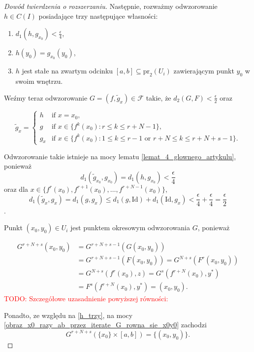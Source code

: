 \documentclass[licencjacka]{pwr_wmat_praca_dyplomowa}
\theoremstyle{plain}
\numberwithin{theorem}{chapter}
\theoremstyle{definition}
\numberwithin{theorem}{chapter}
\begin{document}
\begin{proof}[Dowód twierdzenia o rozszerzaniu]
Następnie, rozważmy odwzorowanie $h \in C(I)$ posiadające trzy następujące własności:
\begin{enumerate}[label=(h\arabic*)]
\item \label{h_jeden} $d_1(h, g_{x_0}) < \frac{\epsilon}{4}$,
\item \label{h_dwa} $h(y_0) = g_{x_0}(y_0)$,
\item \label{h_trzy} $h$ jest stałe na zwartym odcinku $[a,b] \subseteq \textrm{pr}_2(U_i)$ zawierającym punkt $y_0$ w swoim wnętrzu.
\end{enumerate}

Weźmy teraz odwzorowanie $G = (f, \widetilde{g}_x) \in \mathcal{F}$ takie, że $d_2(G, F) < \frac{\epsilon}{2}$ oraz

\begin{equation}
    \widetilde{g}_x =
    \begin{cases}
        h & \text{if $x=x_0$,}\\
        g & \text{if $x \in \{f^k(x_0) : r \leq k \leq r+N-1\}$,}\\
        g_x & \text{if $x \in \{f^k(x_0) : 1 \leq k \leq r-1$ or $r+N \leq k \leq r+N+s-1\}$.}
    \end{cases}
\end{equation}

Odwzorowanie takie istnieje na mocy lematu \ref{lemat_4_glownego_artykulu}, ponieważ
$$d_1(\widetilde{g}_{x_0}, g_{x_0}) = d_1(h, g_{x_0}) < \frac{\epsilon}{4}$$
oraz dla $x \in \{f^r(x_0), f^{r+1}(x_0), \ldots, f^{r+N-1}(x_0)\}$,
$$d_1(\widetilde{g}_x, g_x) = d_1(g, g_x) \leq d_1(g, \mathrm{Id}) + d_1(\mathrm{Id}, g_x) < \frac{\epsilon}{4} + \frac{\epsilon}{4} = \frac{\epsilon}{2}$$.

Punkt $(x_0, y_0) \in U_i$ jest punktem okresowym odwzorowania $G$, ponieważ

\begin{equation}
\begin{split}
G^{r+N+s}(x_0, y_0) & = G^{r+N+s-1}(G(x_0, y_0)) \\
& = G^{r+N+s-1}(F(x_0, y_0)) = G^{N+s}(F^r(x_0, y_0)) \\
& = G^{N+s}(f^r(x_0), z) = G^s(f^{r+N}(x_0), y^*) \\
& = F^s(f^{r+N}(x_0), y^*) = (x_0, y_0).
\end{split}
\end{equation}
\textcolor{red}{TODO: Szczegółowe uzasadnienie powyższej równości:}

Ponadto, ze względu na \ref{h_trzy}, na mocy \ref{obraz_x0_razy_ab_przez_iterate_G_rowna_sie_x0y0} zachodzi
$$G^{r+N+s}(\{x_0\} \times [a, b]) = \{(x_0, y_0)\}.$$


\end{proof}
\end{document}
